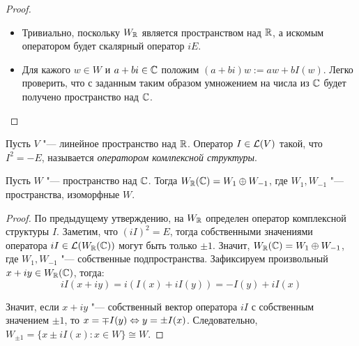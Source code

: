 \begin{proof}~
	\begin{itemize}
		\item{}Тривиально, поскольку $W_{\mathbb{R}}$ является пространством над $\mathbb{R}$, а искомым оператором будет скалярный оператор $iE$.
		\item{}Для кажого $w \in W$ и $a + bi \in \mathbb{C}$ положим $(a + bi)w := aw + bI(w)$. Легко проверить, что с заданным таким образом умножением на числа из $\mathbb{C}$ будет получено пространство над $\mathbb{C}$.\qedhere
	\end{itemize}
\end{proof}

\begin{definition}
	Пусть $V$ "--- линейное пространство над $\mathbb{R}$. Оператор $I \in \mathcal L(V)$ такой, что $I^2 = -E$, называется \textit{оператором комлпексной структуры}.
\end{definition}

\begin{proposition}
	Пусть $W$ "--- пространство над $\mathbb{C}$. Тогда $W_{\mathbb{R}}(\mathbb{C}) = W_1 \oplus W_{-1}$, где $W_1, W_{-1}$ "--- пространства, изоморфные $W$.
\end{proposition}

\begin{proof}
	По предыдущему утверждению, на $W_{\mathbb{R}}$ определен оператор комплексной структуры $I$. Заметим, что $(iI)^2 = E$, тогда собственными значениями оператора $iI \in \mathcal L(W_{\mathbb{R}}(\mathbb{C}))$ могут быть только $\pm1$. Значит, $W_{\mathbb{R}}(\mathbb{C}) = W_1 \oplus W_{-1}$, где $W_1, W_{-1}$ "--- собственные подпространства. Зафиксируем произвольный $x + iy \in W_{\mathbb{R}}(\mathbb{C})$, тогда:
	\[iI(x + iy) = i(I(x) + iI(y)) = -I(y) + iI(x)\]
	
	Значит, если $x + iy$ "--- собственный вектор оператора $iI$ с собственным значением $\pm1$, то $x = \mp I(y) \Leftrightarrow y = \pm I(x)$. Следовательно, $W_{\pm1} = \{x \pm iI(x) : x \in W\} \cong W$.
\end{proof}